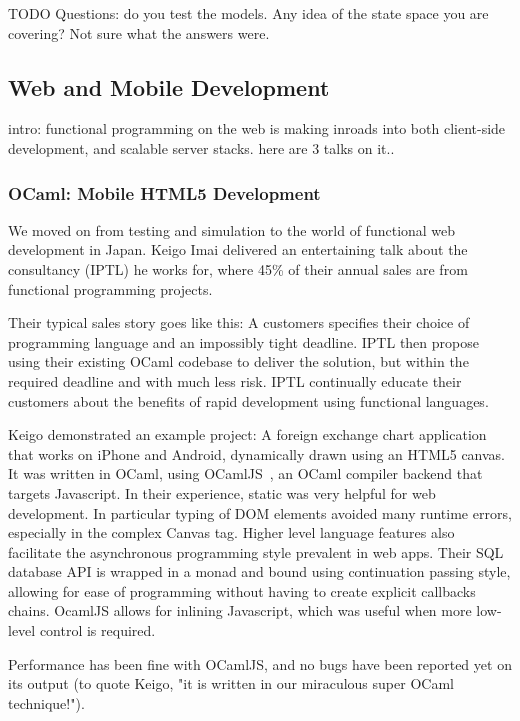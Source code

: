 \documentclass{jfp1}
\begin{document}
TODO Questions: do you test the models.  Any idea of the state space
you are covering?  Not sure what the answers were.

\subsection{Web and Mobile Development}

intro: functional programming on the web is making inroads into both client-side development, and scalable server stacks. here are 3 talks on it..

\subsubsection{OCaml: Mobile HTML5 Development}

We moved on from testing and simulation to the world of functional web
development in Japan. Keigo Imai delivered an entertaining talk about the
consultancy (IPTL) he works for, where 45\% of their annual sales are from
functional programming projects.

Their typical sales story goes like this: A customers specifies their
choice of programming language and an impossibly tight deadline.  IPTL
then propose using their existing OCaml codebase to deliver the
solution, but within the required deadline and with much less risk.
IPTL continually educate their customers about the benefits of rapid
development using functional languages.

Keigo demonstrated an example project: A foreign exchange chart
application that works on iPhone and Android, dynamically drawn using
an HTML5 canvas.  It was written in OCaml, using OCamlJS~\cite{x}, an
OCaml compiler backend that targets Javascript.  In their experience,
static was very helpful for web development.  In particular typing of
DOM elements avoided many runtime errors, especially in the complex
Canvas tag.  Higher level language features also facilitate the
asynchronous programming style prevalent in web apps.  Their SQL
database API is wrapped in a monad and bound using continuation
passing style, allowing for ease of programming without having to
create explicit callbacks chains.  OcamlJS allows for inlining
Javascript, which was useful when more low-level control is required.

Performance has been fine with OCamlJS, and no bugs have been reported
yet on its output (to quote Keigo, "it is written in our miraculous
super OCaml technique!").
\end{document}
